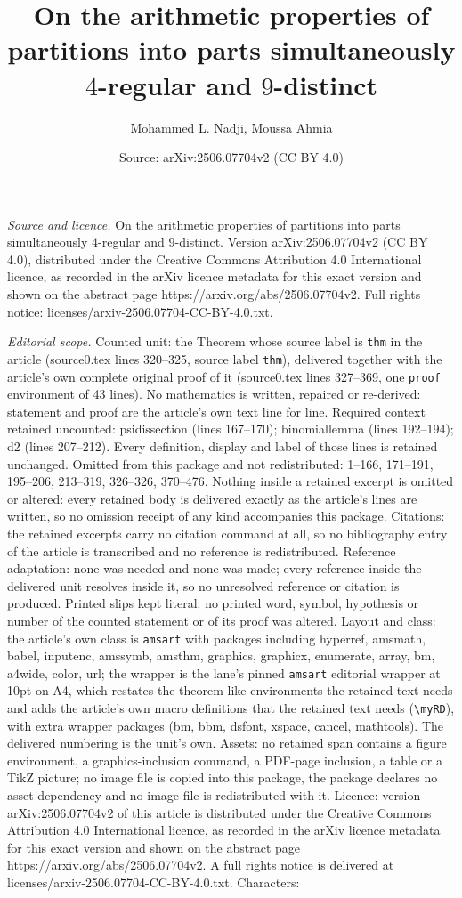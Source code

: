 \documentclass[10pt,a4paper]{amsart}
\title[On the arithmetic properties of partitions into parts simult]{On the arithmetic properties of partitions into parts simultaneously $4$-regular and $9$-distinct}
\author{Mohammed L. Nadji, Moussa Ahmia}
\date{Source: arXiv:2506.07704v2 (CC BY 4.0)}
\begin{document}
\maketitle

\noindent\emph{Source and licence.} On the arithmetic properties of partitions into parts simultaneously $4$-regular and $9$-distinct. Version arXiv:2506.07704v2 (CC BY 4.0), distributed under the Creative Commons Attribution 4.0 International licence, as recorded in the arXiv licence metadata for this exact version and shown on the abstract page https://arxiv.org/abs/2506.07704v2. Full rights notice: licenses/arxiv-2506.07704-CC-BY-4.0.txt.\par\smallskip

\noindent\textit{Editorial scope.} Counted unit: the Theorem whose source label is \texttt{thm} in the article (source0.tex lines 320--325, source label \texttt{thm}), delivered together with the article's own complete original proof of it (source0.tex lines 327--369, one \texttt{proof} environment of 43 lines). No mathematics is written, repaired or re-derived: statement and proof are the article's own text line for line. Required context retained uncounted: psidissection (lines 167--170); binomiallemma (lines 192--194); d2 (lines 207--212). Every definition, display and label of those lines is retained unchanged. Omitted from this package and not redistributed: 1--166, 171--191, 195--206, 213--319, 326--326, 370--476. Nothing inside a retained excerpt is omitted or altered: every retained body is delivered exactly as the article's lines are written, so no omission receipt of any kind accompanies this package. Citations: the retained excerpts carry no citation command at all, so no bibliography entry of the article is transcribed and no reference is redistributed. Reference adaptation: none was needed and none was made; every reference inside the delivered unit resolves inside it, so no unresolved reference or citation is produced. Printed slips kept literal: no printed word, symbol, hypothesis or number of the counted statement or of its proof was altered. Layout and class: the article's own class is \texttt{amsart} with packages including hyperref, amsmath, babel, inputenc, amssymb, amsthm, graphics, graphicx, enumerate, array, bm, a4wide, color, url; the wrapper is the lane's pinned \texttt{amsart} editorial wrapper at 10pt on A4, which restates the theorem-like environments the retained text needs and adds the article's own macro definitions that the retained text needs (\texttt{\textbackslash myRD}), with extra wrapper packages (bm, bbm, dsfont, xspace, cancel, mathtools). The delivered numbering is the unit's own. Assets: no retained span contains a figure environment, a graphics-inclusion command, a PDF-page inclusion, a table or a TikZ picture; no image file is copied into this package, the package declares no asset dependency and no image file is redistributed with it. Licence: version arXiv:2506.07704v2 of this article is distributed under the Creative Commons Attribution 4.0 International licence, as recorded in the arXiv licence metadata for this exact version and shown on the abstract page https://arxiv.org/abs/2506.07704v2. A full rights notice is delivered at licenses/arxiv-2506.07704-CC-BY-4.0.txt. Characters: 
\end{document}
